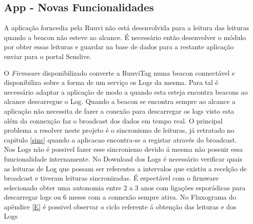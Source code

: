 \subsection{App - Novas Funcionalidades}

\par A aplicação forncedia pela Ruuvi não está desenvolvida para a leitura das leituras quando a beacon não esteve ao alcance. É necessário então desenvolver o módulo por obter essas leituras e guardar na base de dados para a restante aplicação enviar para o portal Senslive.
\par O \textit{Firmware} disponibilizado converte a RuuviTag numa beacon connectável e disponibiliza sobre a forma de um serviço os Logs da mesma\cite{ruuvitlog}. Para tal é necessário adaptar a aplicação de modo a quando esta esteja encontra beacons ao alcance descarregue o Log.  Quando a beacon se encontra sempre ao alcance a aplicação não necessita de fazer a conexão para descarregar os logs visto esta além da connexção faz o broadcast dos dados em tempo real. O principal problema a resolver neste projeto é o sincronismo de leituras, já retratado no capitulo \ref{sinc} quando a aplicacao encontra-se a registar através do broadcast. Nos Logs não é possivel fazer esse sincronismo devido á mesma não possuir essa funcionalidade internamente. No Download dos Logs é necessário verificar quais as leituras de Log que possam ser referentes a intervalos que existiu a recelção de broadcast e tiveram leituras sincronizadas. É espectável com o firmware selecionado obter uma autonomia entre 2 a 3 anos com ligações esporádicas para descarregar logs ou 6 meses com a connexão sempre ativa. No Fluxograma do apêndice \ref{E} é possivel observar o ciclo referente á obtenção das leituras e dos Logs



